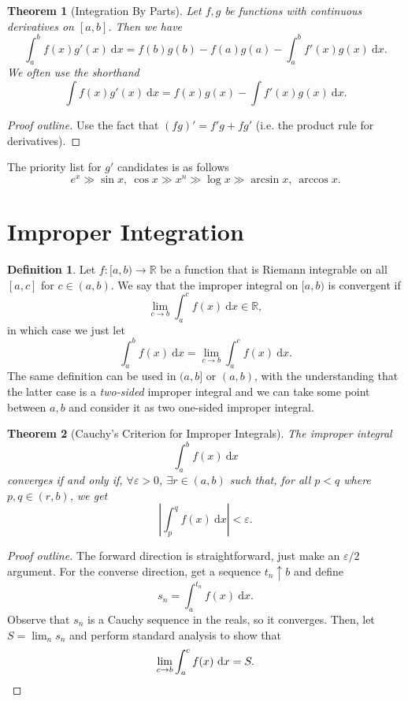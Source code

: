 \documentclass[letterpaper,12pt]{article}
\theoremstyle{definition}
\newtheorem{definition}{Definition}[section]
\theoremstyle{plain}
\newtheorem{thm}{Theorem}[section]
\theoremstyle{remark}
\newcommand{\R}{\mathbb{R}}
\begin{document}
\begin{thm}[Integration By Parts]
Let $f,g$ be functions with continuous derivatives on $[a,b]$. Then we have
\[\int_{a}^{b} f(x)g'(x) \ \mathrm{d}x = f(b)g(b)-f(a)g(a)-\int_{a}^{b} f'(x)g(x) \ \mathrm{d}x.\]
We often use the shorthand
\[
\int f(x)g'(x) \ \mathrm{d}x = f(x)g(x) - \int f'(x)g(x) \ \mathrm{d}x.
\]
\end{thm}
\begin{proof}[Proof outline]
Use the fact that $(fg)' = f'g+fg'$ (i.e. the product rule for derivatives).
\end{proof}

The priority list for $g'$ candidates is as follows
\[e^x\gg \sin x,\ \cos x\gg x^n\gg \log x \gg \arcsin x,\ \arccos x.\]

\section{Improper Integration}
\begin{definition}
Let $f:[a,b)\to \R$ be a function that is Riemann integrable on all $[a,c]$ for $c\in(a,b)$. We say that the improper integral on $[a,b)$ is convergent if
\[\lim_{c\to b}\int_a^c f(x)\ \mathrm{d}x \in\R,\]
in which case we just let
\[\int_{a}^{b} f(x) \ \mathrm{d}x = \lim_{c\to b}\int_{a}^{c} f(x) \ \mathrm{d}x.\]
The same definition can be used in $(a,b]$ or $(a,b)$, with the understanding that the latter case is a \emph{two-sided} improper integral and we can take some point between $a,b$ and consider it as two one-sided improper integral.
\end{definition}

\begin{thm}[Cauchy's Criterion for Improper Integrals]
The improper integral
\[\int_a^b f(x)\ \mathrm{d}x\]
converges if and only if, $\forall \varepsilon>0$, $\exists r\in(a,b)$ such that, for all $p<q$ where $p,q\in(r,b)$, we get
\[\left|\int_{p}^{q} f(x) \ \mathrm{d}x\right|<\varepsilon.\]
\end{thm}

\begin{proof}[Proof outline]
The forward direction is straightforward, just make an $\varepsilon/2$ argument. For the converse direction, get a sequence $t_n\uparrow b$ and define
\[s_n = \int_a^{t_n} f(x)\ \mathrm{d}x.\]
Observe that $s_n$ is a Cauchy sequence in the reals, so it converges. Then, let $S = \lim_n s_n$ and perform standard analysis to show that
\[\lim_{c\to b}\int_a^c f(x) \ \mathrm{d}x = S.\qedhere\]
\end{proof}
\end{document}
